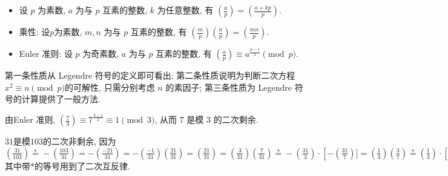 \documentclass[main]{subfiles}
\begin{document}
\begin{proposition}
	\begin{itemize}
		\item 设 $p$ 为素数, $a$ 为与 $p$ 互素的整数, $k$ 为任意整数, 有 \(\left( \frac{a}{p} \right) = \left( \frac{a + kp}{p} \right)\).
		\item \textup{乘性:} 设$p$为素数, $m, n$ 为与 $p$ 互素的整数, 有 \(\left( \frac{m}{p} \right) \left( \frac{n}{p} \right) = \left( \frac{mn}{p} \right)\).
		\item \textup{Euler 准则:} 设 $p$ 为奇素数, $a$ 为与 $p$ 互素的整数, 有 \(\left(\frac{a}{p}\right) \equiv a^{\frac{p-1}{2}} \pmod p\).
	\end{itemize}
\end{proposition}

第一条性质从 Legendre 符号的定义即可看出; 第二条性质说明为判断二次方程$x^2 \equiv n \pmod p$的可解性, 只需分别考虑 $n$ 的素因子; 第三条性质为 Legendre 符号的计算提供了一般方法.

\begin{example}[开始的例子]
	由\textup{Euler 准则}, \(\left( \frac{7}{3} \right) \equiv 7^{\frac{3-1}{2}} \equiv 1 \pmod 3\), 从而 $ 7 $ 是模 $ 3 $ 的二次剩余.
\end{example}

\begin{example}[大素数]
	$31$是模$103$的二次非剩余, 因为\(\left(\frac{31}{103}\right)
	\stackrel{*}{=} -\left(\frac{103}{31}\right)
	= -\left(\frac{-21}{31}\right)
	= -\left(\frac{-1}{31}\right) \left(\frac{21}{31}\right)
	= \left(\frac{21}{31}\right)
	= \left(\frac{3}{31}\right) \left(\frac{7}{31}\right)
	\stackrel{*}{=} -\left(\frac{31}{3}\right) \cdot \left[- \left(\frac{31}{7}\right)]
	= \left(\frac{1}{3}\right) \left(\frac{3}{7}\right)
	\stackrel{*}{=} \left(\frac{1}{3}\right) \cdot \left[- \left(\frac{7}{3}\right)\right]
	= -1.\) 其中带$ * $的等号用到了二次互反律.
\end{example}
\end{document}
